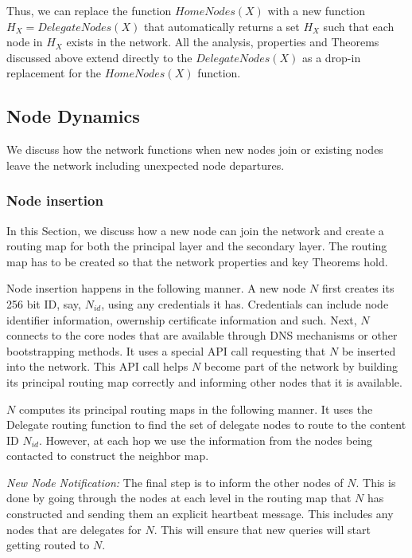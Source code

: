 Thus, we can replace the function \(HomeNodes(X)\) with a new function \(H_X = DelegateNodes(X)\) that automatically returns a
set \(H_X\) such that each node in \(H_X\) exists in the network. All the analysis, properties and Theorems discussed
above extend directly to the \(DelegateNodes(X)\) as a drop-in replacement for the \(HomeNodes(X)\) function.


\subsection{Node Dynamics}
\label{net:node_dynamics}

We discuss how the network functions when new nodes join or existing nodes leave the network including unexpected node
departures.

\subsubsection{Node insertion}

In this Section, we discuss how a new node can join the network and create a routing map for both the principal layer
and the secondary layer. The routing map has to be created so that the network properties and key Theorems hold.

Node insertion happens in the following manner. A new node \(N\) first creates its 256 bit ID,
say, \(N_{id}\), using any credentials it has. Credentials can include node identifier information, owernship
certificate information and such. Next, \( N \) connects to the core nodes that are available through DNS mechanisms or
other bootstrapping methods. It uses a special API call requesting that \(N\) be inserted into the network. This API
call helps \(N\) become part of the network by building its principal routing map correctly and informing other nodes
that it is available.

\(N\) computes its principal routing maps in the following manner. It uses the Delegate routing function to find the set of delegate
nodes to route to the content ID \(N_{id}\). However, at each hop we use the information from the nodes being contacted
to construct the neighbor map.

{\em New Node Notification:} The final step is to inform the other nodes of \(N\). This is done by going through the
nodes at each level in the routing map that \(N\) has constructed and sending them an explicit heartbeat message. This
includes any nodes that are delegates for \(N\). This will ensure that new queries will start getting routed to \(N\).

